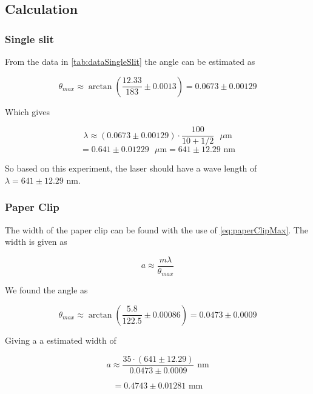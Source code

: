 \documentclass{emulateapj}
\begin{document}
\subsection{Calculation}
\subsubsection{Single slit}


From the data in \ref{tab:dataSingleSlit} the angle can be estimated as

\begin{equation}
\theta_{max} \approx \arctan\left( \frac{12.33}{183} \pm 0.0013 \right) = 0.0673 \pm 0.00129
\end{equation}

Which gives 

\begin{equation}
\lambda \approx (0.0673 \pm 0.00129) \cdot \frac{100}{10 +1/2}\text{ }\mu \text{m} 
\end{equation}
\begin{equation}
= 0.641\pm 0.01229\text{ }\mu \text{m} = 641 \pm 12.29 \text{ nm}
\end{equation}\label{eq:waveLenghtLaser}

So based on this experiment, the laser should have a wave length of $\lambda = 641 \pm 12.29 \text{ nm} $.

\subsubsection{Paper Clip}

The width of the paper clip can be found with the use of \eqref{eq:paperClipMax}. The width is given as

\begin{equation}
a \approx \frac{m \lambda}{\theta_{max}}
\end{equation}

We found the angle as

\begin{equation}
\theta_{max} \approx \arctan\left(\frac{5.8}{122.5} \pm 0.00086\right) =0.0473 \pm 0.0009
\end{equation}

Giving a a estimated width of

\begin{equation}
a \approx \frac{35\cdot (641 \pm 12.29)}{0.0473 \pm 0.0009} \text{ nm}
\end{equation} 

\begin{equation}
= 0.4743 \pm 0.01281 \text{ mm}
\end{equation}\label{eq:widthPaperClip}
\end{document}

